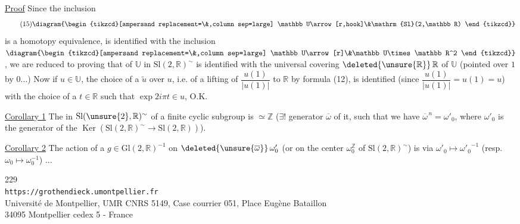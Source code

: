 
\uline{Proof} Since the inclusion
\[
\tag{15}
\diagram{\begin{tikzcd}[ampersand replacement=\&,column sep=large]
\mathbb U\arrow[r,hook]\&\mathrm{Sl}(2,\mathbb R)
\end{tikzcd}}
\]
is a homotopy equivalence,
 is identified 
with the inclusion
$\diagram{\begin{tikzcd}[ampersand replacement=\&,column sep=large]
\mathbb U\arrow[r]\&\mathbb U\times\mathbb R^2
\end{tikzcd}}$,
we are reduced to proving that
of $\mathbb U$ in $\mathrm{Sl}(2,\mathbb R)^{\sim}$
is identified with the universal covering
$\deleted{\unsure{\mathbb R}}\,\mathbb R$ of $\mathbb U$
(pointed over $1$ by $0\ldots$)
Now if $u\in\mathbb U$, the 
choice of a $\widetilde u$ over $u$, i.e. of a lifting of
$\dfrac{u(1)}{|u(1)|}$ to $\mathbb R$ by formula (12),
is identified (since $\dfrac{u(1)}{|u(1)|}=u(1)=u$)
with the choice of a $t\in\mathbb R$ such that $\exp 2i\pi t\in u$, O.K.

\uline{Corollary 1} The   in
$\mathrm{Sl}(\unsure{2},\mathbb R)^{\sim}$ of a
finite cyclic subgroup  is $\simeq\mathbb Z$
($\exists!$ generator $\overline\omega$ of it,
such that we have $\overline\omega^{\,n}=\omega'_0$,
where $\omega'_0$ is the  generator
of the $\operatorname{Ker}(\mathrm{Sl}(2,\mathbb R)^{\sim}
\to\mathrm{Sl}(2,\mathbb R))$).


\uline{Corollary 2} The action of a $g\in\mathrm{Gl}(2,\mathbb R)^{-1}$
on $\deleted{\unsure{\overline\omega}}\,\omega'_0$
(or on the center $\omega_0^{\mathbb Z}$ of
$\mathrm{Sl}(2,\mathbb R)^{\sim}$)
is via $\omega'_0\mapsto{\omega'_0}^{-1}$
(resp. $\omega_0\mapsto\omega_0^{-1}$) $\ldots$


\begin{center}
229\\
\texttt{https://grothendieck.umontpellier.fr}\\
Université de Montpellier, UMR CNRS 5149, Case courrier 051, Place Eugène Bataillon\\
34095 Montpellier cedex 5 - France
\end{center}

